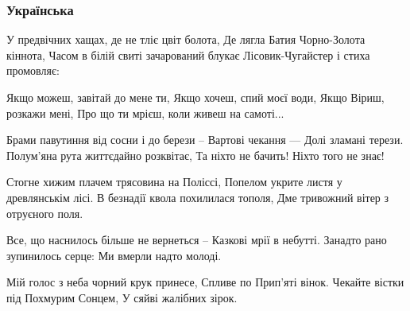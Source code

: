  
 

\subsubsection{Українська}
\label{sec:songs.tin_soncja.pisnja_chugajstera.ukr}

У предвічних хащах, де не тліє цвіт болота,
Де лягла Батия Чорно-Золота кіннота,
Часом в білій свиті зачарований блукає
Лісовик-Чугайстер і стиха промовляє:

Якщо можеш, завітай до мене ти,
Якщо хочеш, спий моєї води,
Якщо Віриш, розкажи мені,
Про що ти мрієш, коли живеш на самоті...

Брами павутиння від сосни і до берези –
Вартові чекання --- Долі зламані терези.
Полум’яна рута життєдайно розквітає,
Та ніхто не бачить! Ніхто того не знає!

Стогне хижим плачем трясовина на Поліссі,
Попелом укрите листя у древлянськім лісі.
В безнадії квола похилилася тополя,
Дме тривожний вітер з отруєного поля.

Все, що наснилось більше не вернеться –
Казкові мрії в небутті.
Занадто рано зупинилось серце:
Ми вмерли надто молоді.

Мій голос з неба чорний крук принесе,
Спливе по Прип’яті вінок.
Чекайте вістки під Похмурим Сонцем,
У сяйві жалібних зірок.
